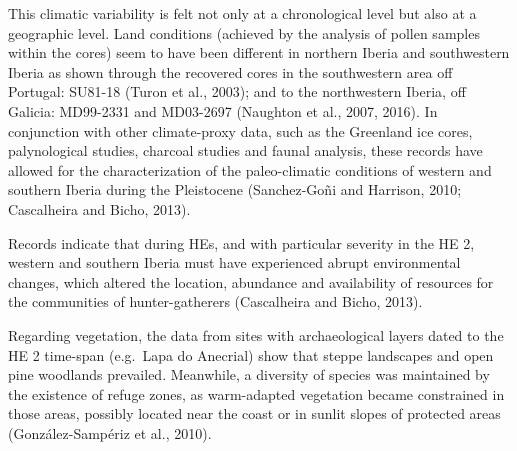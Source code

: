 \documentclass[12pt,twoside]{reedthesis}
\begin{document}
This climatic variability is felt not only at a chronological level but also at a geographic level. Land conditions (achieved by the analysis of pollen samples within the cores) seem to have been different in northern Iberia and southwestern Iberia as shown through the recovered cores in the southwestern area off Portugal: SU81-18 (Turon et al., 2003); and to the northwestern Iberia, off Galicia: MD99-2331 and MD03-2697 (Naughton et al., 2007, 2016). In conjunction with other climate-proxy data, such as the Greenland ice cores, palynological studies, charcoal studies and faunal analysis, these records have allowed for the characterization of the paleo-climatic conditions of western and southern Iberia during the Pleistocene (Sanchez-Goñi and Harrison, 2010; Cascalheira and Bicho, 2013).

Records indicate that during HEs, and with particular severity in the HE 2, western and southern Iberia must have experienced abrupt environmental changes, which altered the location, abundance and availability of resources for the communities of hunter-gatherers (Cascalheira and Bicho, 2013).

Regarding vegetation, the data from sites with archaeological layers dated to the HE 2 time-span (e.g.~Lapa do Anecrial) show that steppe landscapes and open pine woodlands prevailed. Meanwhile, a diversity of species was maintained by the existence of refuge zones, as warm-adapted vegetation became constrained in those areas, possibly located near the coast or in sunlit slopes of protected areas (González-Sampériz et al., 2010).
\end{document}
